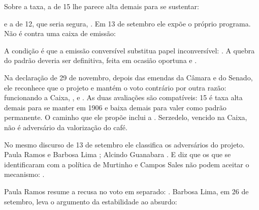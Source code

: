 Sobre a taxa, a de 15 lhe parece alta demais para se sustentar:


e a de 12, que seria segura,  . Em 13 de setembro ele expõe o
próprio programa. Não é contra uma caixa de emissão:


A condição é que a emissão conversível substitua papel inconversível:
 . A quebra do padrão deveria ser
definitiva, feita em ocasião oportuna e  .

Na declaração de 29 de novembro, depois das emendas da Câmara e do Senado, ele
reconhece que o projeto   e mantém o voto contrário por outra
razão: funcionando a Caixa, , e 
. As duas avaliações são compatíveis: 15 é taxa alta demais para
se manter em 1906 e baixa demais para valer como padrão permanente. O caminho
que ele propõe inclui a  . Serzedelo, vencido na Caixa, não é adversário da
valorização do café.

No mesmo discurso de 13 de setembro ele classifica os adversários do projeto.
Paula Ramos e Barbosa Lima ; Alcindo Guanabara
. E diz que os que se identificaram com a política de Murtinho e
Campos Sales não podem aceitar o mecanismo:  .


Paula Ramos resume a recusa no voto em separado:  . Barbosa Lima, em 26 de
setembro, leva o argumento da estabilidade ao absurdo:

